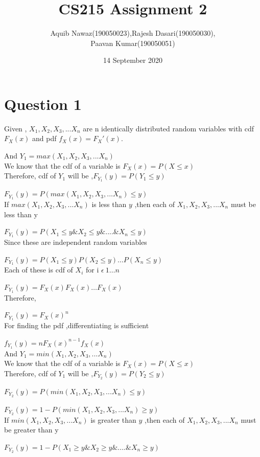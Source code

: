 \documentclass{article}
\title{CS215 Assignment 2}
\author{Aquib Nawaz(190050023),Rajesh Dasari(190050030),\\Paavan Kumar(190050051)}
\date{14 September 2020}
\begin{document}
\maketitle
\section*{Question 1}
    Given , $X_1,X_2,X_3 ,...X_n$ are n identically distributed random variables with cdf $F_X(x)$ and pdf $f_X(x) = F_X'(x)$.\par 
    And $Y_1 = max(X_1,X_2,X_3 ,...X_n)$\\
    We know that the cdf of a variable is $F_X(x) = P(X\leq x)$\\
    Therefore, cdf of $Y_1$  will be ,$F_{Y_1}(y) = P(Y_1 \leq y)$\par 
    $F_{Y_1}(y) = P(max(X_1,X_2,X_3 ,...X_n) \leq y)$\\
    If $max(X_1,X_2,X_3 ,...X_n)$ is less than $y$ ,then each of $X_1,X_2,X_3 ,...X_n$ must be less than y\par
    $F_{Y_1}(y) = P(X_1 \leq y \& X_2 \leq y \& .... \& X_n \leq y)$\\ 
    Since these are independent random variables\par 
    $F_{Y_1}(y) = P(X_1 \leq y)  P(X_2 \leq y)   \dots P(X_n \leq y)$\\
    Each of these is cdf of $X_i$ for i $\epsilon \  1 \dots n$\par 
    $F_{Y_1}(y) = F_X(x)  F_X(x)  \dots F_X(x)$\\
    Therefore,\par 
    $F_{Y_1}(y) = {F_X(x)}^n$\\
    For finding the pdf ,differentiating is sufficient\par
    $f_{Y_1}(y) = n{F_X(x)}^{n-1} f_X(x)$\\
    \hline
    And $Y_1 = min(X_1,X_2,X_3 ,...X_n)$\\
    We know that the cdf of a variable is $F_X(x) = P(X\leq x)$\\
    Therefore, cdf of $Y_1$  will be ,$F_{Y_2}(y) = P(Y_2 \leq y)$\par 
    $F_{Y_2}(y) = P(min(X_1,X_2,X_3 ,...X_n) \leq y)$\par 
    $F_{Y_2}(y) = 1 - P(min(X_1,X_2,X_3 ,...X_n) \geq y)$\\
    If $min(X_1,X_2,X_3 ,...X_n)$ is greater than $y$ ,then each of $X_1,X_2,X_3 ,...X_n$ must be greater than y\par
    $F_{Y_2}(y) = 1 - P(X_1 \geq y \& X_2 \geq y \& .... \& X_n \geq y)$\\ 
\end{document}
